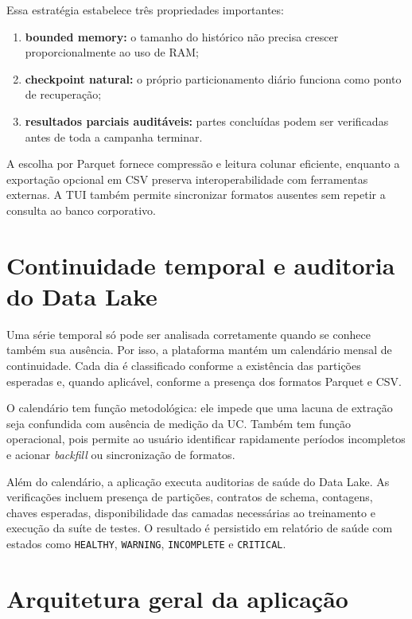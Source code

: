Essa estratégia estabelece três propriedades importantes:

\begin{enumerate}
\def\labelenumi{\arabic{enumi}.}
\item
  \textbf{bounded memory:} o tamanho do histórico não precisa crescer proporcionalmente ao uso de RAM;
\item
  \textbf{checkpoint natural:} o próprio particionamento diário funciona como ponto de recuperação;
\item
  \textbf{resultados parciais auditáveis:} partes concluídas podem ser verificadas antes de toda a campanha terminar.
\end{enumerate}

A escolha por Parquet fornece compressão e leitura colunar eficiente, enquanto a exportação opcional em CSV preserva interoperabilidade com ferramentas externas. A TUI também permite sincronizar formatos ausentes sem repetir a consulta ao banco corporativo.

\section{Continuidade temporal e auditoria do Data Lake}\label{continuidade-temporal-e-auditoria-do-data-lake}

Uma série temporal só pode ser analisada corretamente quando se conhece também sua ausência. Por isso, a plataforma mantém um calendário mensal de continuidade. Cada dia é classificado conforme a existência das partições esperadas e, quando aplicável, conforme a presença dos formatos Parquet e CSV.

O calendário tem função metodológica: ele impede que uma lacuna de extração seja confundida com ausência de medição da UC. Também tem função operacional, pois permite ao usuário identificar rapidamente períodos incompletos e acionar \emph{backfill} ou sincronização de formatos.

Além do calendário, a aplicação executa auditorias de saúde do Data Lake. As verificações incluem presença de partições, contratos de schema, contagens, chaves esperadas, disponibilidade das camadas necessárias ao treinamento e execução da suíte de testes. O resultado é persistido em relatório de saúde com estados como \texttt{HEALTHY}, \texttt{WARNING}, \texttt{INCOMPLETE} e \texttt{CRITICAL}.

\section{Arquitetura geral da aplicação}\label{arquitetura-geral-da-aplicauxe7uxe3o}


